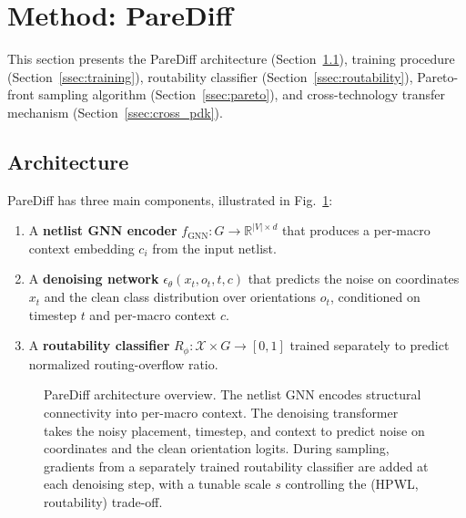 
\section{Method: PareDiff}
\label{sec:method}

This section presents the PareDiff architecture (Section~\ref{ssec:arch}), training procedure (Section~\ref{ssec:training}), routability classifier (Section~\ref{ssec:routability}), Pareto-front sampling algorithm (Section~\ref{ssec:pareto}), and cross-technology transfer mechanism (Section~\ref{ssec:cross_pdk}).

\subsection{Architecture}
\label{ssec:arch}

PareDiff has three main components, illustrated in Fig.~\ref{fig:arch}:
\begin{enumerate}
\item A \textbf{netlist GNN encoder} $f_\textrm{GNN}: G \to \mathbb{R}^{|V| \times d}$ that produces a per-macro context embedding $c_i$ from the input netlist.
\item A \textbf{denoising network} $\epsilon_\theta(x_t, o_t, t, c)$ that predicts the noise on coordinates $x_t$ and the clean class distribution over orientations $o_t$, conditioned on timestep $t$ and per-macro context $c$.
\item A \textbf{routability classifier} $R_\phi: \mathcal{X} \times G \to [0, 1]$ trained separately to predict normalized routing-overflow ratio.
\end{enumerate}

\begin{figure}[t]
\centering
\caption{PareDiff architecture overview. The netlist GNN encodes structural connectivity into per-macro context. The denoising transformer takes the noisy placement, timestep, and context to predict noise on coordinates and the clean orientation logits. During sampling, gradients from a separately trained routability classifier are added at each denoising step, with a tunable scale $s$ controlling the (HPWL, routability) trade-off.}
\label{fig:arch}
\end{figure}

